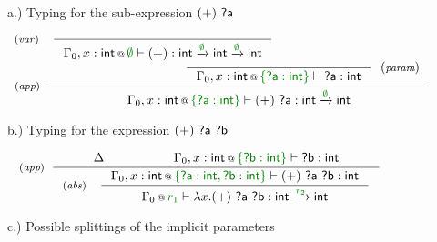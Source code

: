 \begin{figure}
{\small a.) Typing for the sub-expression $(+)~\ident{?a}$}

\begin{equation*}
\begin{array}{l}
 \tyrule{app}
  { \hspace{-15em}\tyrule{var}{}
    { \coctx{\Gamma_0, x:\ident{int}}{\cclrd{ \emptyset }} \vdash
      (+) : \ident{int} \xrightarrow{\cclrd{\emptyset}} \ident{int} \xrightarrow{\cclrd{\emptyset}} \ident{int}} \\ \hspace{10em}
    \tyruler{param}{}
    { \coctx{\Gamma_0, x:\ident{int}}{\cclrd{ \{ \ident{?a}:\ident{int} \} }} \vdash
      \ident{?a} : \ident{int} } }
  { \coctx{\Gamma_0, x:\ident{int}}{\cclrd{ \{ \ident{?a}:\ident{int} \} }} \vdash
    (+)~\ident{?a} : \ident{int} \xrightarrow{\cclrd{\emptyset}} \ident{int} }
\end{array}
\end{equation*}

\vspace{1em}
{\small b.) Typing for the expression $(+)~\ident{?a}~\ident{?b}$}

\begin{equation*}
\tyrule{app}
{ \Delta\qquad\qquad &
  \coctx{\Gamma_0, x:\ident{int}}{\cclrd{ \{ \ident{?b}:\ident{int} \} }} \vdash
  \ident{?b} : \ident{int} }
{ \tyrule{abs}
  { \coctx{\Gamma_0, x:\ident{int}}{\cclrd{ \{\ident{?a}:\ident{int}, \ident{?b}:\ident{int} \} }} \vdash 
    (+)~\ident{?a}~\ident{?b} : \ident{int} }
  { \coctx{\Gamma_0}{\cclrd{ r_1 }} \vdash 
    \lambda x.(+)~\ident{?a}~\ident{?b} : 
    \ident{int} \xrightarrow{ \cclrd{r_2} } \ident{int} } }
\end{equation*}

\vspace{1em}
{\small c.) Possible splittings of the implicit parameters }


\end{figure}
